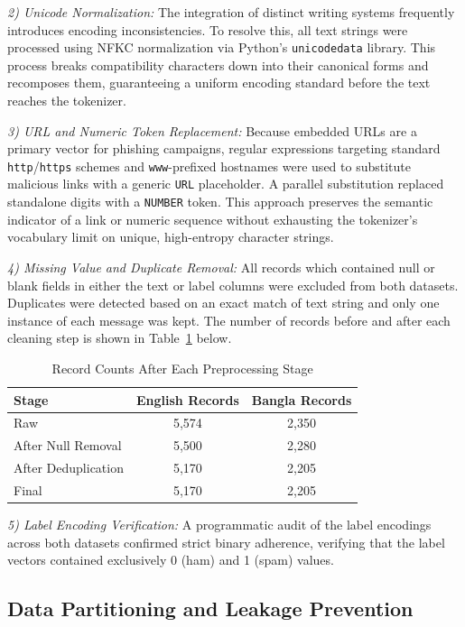 \documentclass[journal]{IEEEtran}
\begin{document}
\textit{2) Unicode Normalization:} The integration of distinct writing systems frequently introduces encoding inconsistencies. To resolve this, all text strings were processed using NFKC normalization via Python's \texttt{unicodedata} library. This process breaks compatibility characters down into their canonical forms and recomposes them, guaranteeing a uniform encoding standard before the text reaches the tokenizer.

\textit{3) URL and Numeric Token Replacement:} Because embedded URLs are a primary vector for phishing campaigns, regular expressions targeting standard \texttt{http}/\texttt{https} schemes and \texttt{www}-prefixed hostnames were used to substitute malicious links with a generic \texttt{URL} placeholder. A parallel substitution replaced standalone digits with a \texttt{NUMBER} token. This approach preserves the semantic indicator of a link or numeric sequence without exhausting the tokenizer's vocabulary limit on unique, high-entropy character strings.

\textit{4) Missing Value and Duplicate Removal:} All records which contained
null or blank fields in either the text or label columns were excluded
from both datasets. Duplicates were detected based on an exact match of
text string and only one instance of each message was kept. The number
of records before and after each cleaning step is shown in Table~\ref{tab:dataset_prep}
below.

\begin{table}[htbp]
\caption{Record Counts After Each Preprocessing Stage}
\label{tab:dataset_prep}
\centering
\begin{tabular}{lcc}
\toprule
\textbf{Stage} & \textbf{English Records} & \textbf{Bangla Records} \\
\midrule
Raw & 5,574 & 2,350 \\
After Null Removal & 5,500 & 2,280 \\
After Deduplication & 5,170 & 2,205 \\
Final & 5,170 & 2,205 \\
\bottomrule
\end{tabular}
\end{table}

\textit{5) Label Encoding Verification:} A programmatic audit of the label encodings across both datasets confirmed strict binary adherence, verifying that the label vectors contained exclusively 0 (ham) and 1 (spam) values.

\subsection{Data Partitioning and Leakage Prevention}
\end{document}
